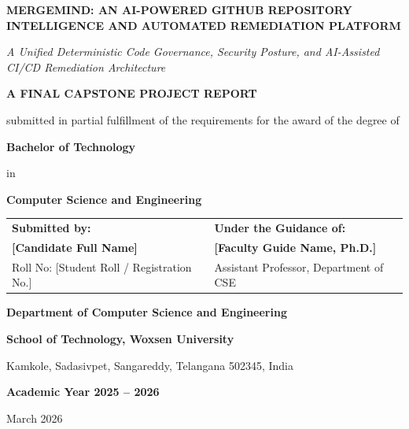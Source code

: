 \begin{titlepage}
    \centering
    \vspace*{1cm}
    
    {\Huge \bfseries MERGEMIND: AN AI-POWERED GITHUB REPOSITORY INTELLIGENCE AND AUTOMATED REMEDIATION PLATFORM \par}
    
    \vspace{0.6cm}
    {\large \itshape A Unified Deterministic Code Governance, Security Posture, and AI-Assisted CI/CD Remediation Architecture \par}
    
    \vspace{1.5cm}
    {\large \bfseries A FINAL CAPSTONE PROJECT REPORT \par}
    \vspace{0.3cm}
    {\normalsize submitted in partial fulfillment of the requirements for the award of the degree of \par}
    \vspace{0.4cm}
    {\large \bfseries Bachelor of Technology \par}
    \vspace{0.2cm}
    {\normalsize in \par}
    \vspace{0.2cm}
    {\large \bfseries Computer Science and Engineering \par}
    
    \vspace{1.8cm}
    \begin{table}[h]
        \centering
        \begin{tabular}{p{} p{}}
            \textbf{Submitted by:} & \textbf{Under the Guidance of:} \\
            \textbf{[Candidate Full Name]} & \textbf{[Faculty Guide Name, Ph.D.]} \\
            Roll No: [Student Roll / Registration No.] & Assistant Professor, Department of CSE \\
        \end{tabular}
    \end{table}
    
    \vfill
    
    {\bfseries Department of Computer Science and Engineering \par}
    {\bfseries School of Technology, Woxsen University \par}
    {\normalsize Kamkole, Sadasivpet, Sangareddy, Telangana 502345, India \par}
    \vspace{0.4cm}
    {\large \bfseries Academic Year 2025 -- 2026 \par}
    {\normalsize March 2026 \par}
\end{titlepage}

